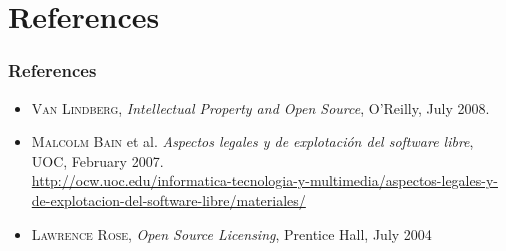 \documentclass{beamer}
\begin{document}
\section{References}

\begin{frame}
\frametitle{References}

\begin{itemize}
\item \textsc{Van Lindberg}, \textit{Intellectual Property and Open Source}, O'Reilly, July 2008.
\item \textsc{Malcolm Bain} et al. \textit{Aspectos legales y de explotación del software libre}, UOC, February 2007. \\
\url{http://ocw.uoc.edu/informatica-tecnologia-y-multimedia/aspectos-legales-y-de-explotacion-del-software-libre/materiales/}
\item \textsc{Lawrence Rose}, \textit{Open Source Licensing}, Prentice Hall, July 2004 
\end{itemize}

\end{frame}


\end{document}
